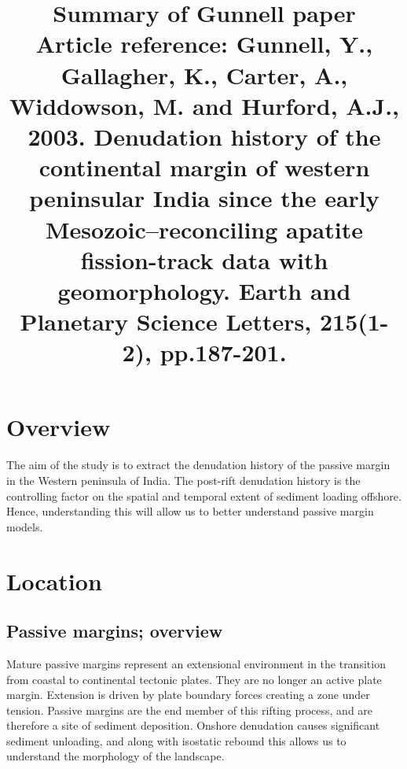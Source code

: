 \documentclass[11pt, oneside]{article}   	%
\title{Summary of Gunnell paper \\
\small Article reference: Gunnell, Y., Gallagher, K., Carter, A., Widdowson, M. and Hurford, A.J., 2003. Denudation history of the continental margin of western peninsular India since the early Mesozoic–reconciling apatite fission-track data with geomorphology. Earth and Planetary Science Letters, 215(1-2), pp.187-201.}
\date{}							%
\begin{document}
\maketitle
\section{Overview}
The aim of the study is to extract the denudation history of the passive margin in the Western peninsula of India.
The post-rift denudation history is the controlling factor on the spatial and temporal extent of sediment loading offshore. Hence, understanding this will allow us to better understand passive margin models.
\section{Location}
\subsection{Passive margins; overview}
Mature passive margins represent an extensional environment in the transition from coastal to continental tectonic plates. They are no longer an active plate margin.
Extension is driven by plate boundary forces creating a zone under tension. Passive margins are the end member of this rifting process, and are therefore a site of sediment deposition. 
Onshore denudation causes significant sediment unloading, and along with isostatic rebound this allows us to understand the morphology of the landscape.
\end{document}
